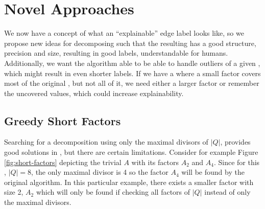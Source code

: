 \chapter{Novel Approaches}
\label{chap:novel-algos}
We now have a concept of what an \enquote{explainable} edge label looks like, so we propose new ideas for decomposing \DFAs such that the resulting \orDecomp has a good structure, precision and size, resulting in good labels, understandable for humans.
Additionally, we want the algorithm able to be able to handle outliers of a given \orDecomp, which might result in even shorter labels.
If we have a \orDecomp where a small factor covers most of the original \DFA, but not all of it, we need either a larger factor or remember the uncovered values, which could increase explainability.

\section{Greedy Short Factors}
\label{ch:novel-algos:greedy-short-factors}
Searching for a decomposition using only the maximal divisors of $|Q|$, provides good solutions in \LogSpace, but there are certain limitations.
Consider for example Figure \ref{fig:short-factors} depicting the trivial \DFA $A$ with its factors $A_2$ and $A_4$.
Since for this \DFA, $|Q| = 8$, the only maximal divisor is 4 so the factor $A_4$ will be found by the original algorithm.
In this particular example, there exists a smaller factor with size 2, $A_2$ which will only be found if checking all factors of $|Q|$ instead of only the maximal divisors.

